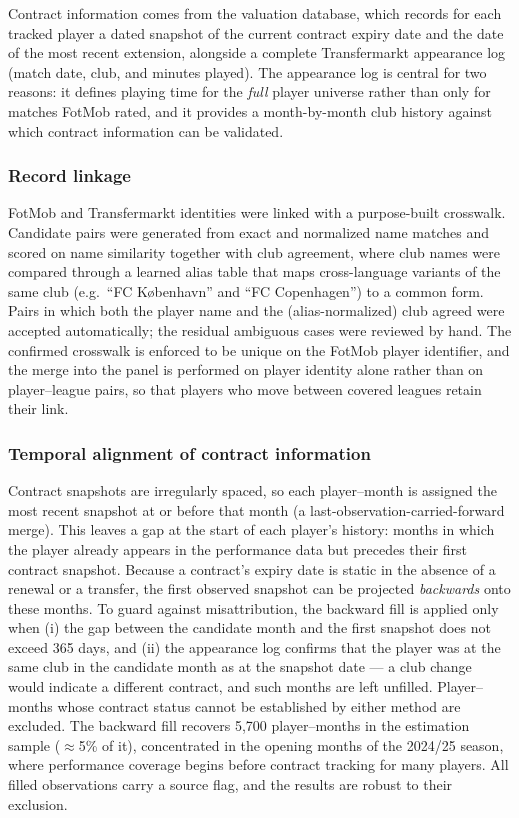 Contract information comes from the valuation database, which records
for each tracked player a dated snapshot of the current contract
expiry date and the date of the most recent extension, alongside a
complete Transfermarkt appearance log (match date, club, and minutes
played). The appearance log is central for two reasons: it defines
playing time for the \emph{full} player universe rather than only for
matches FotMob rated, and it provides a month-by-month club history
against which contract information can be validated.

\subsubsection*{Record linkage}

FotMob and Transfermarkt identities were linked with a purpose-built
crosswalk. Candidate pairs were generated from exact and normalized
name matches and scored on name similarity together with club
agreement, where club names were compared through a learned alias
table that maps cross-language variants of the same club (e.g.\ ``FC
K\o benhavn'' and ``FC Copenhagen'') to a common form. Pairs in which
both the player name and the (alias-normalized) club agreed were
accepted automatically; the residual ambiguous cases were reviewed by
hand. The confirmed crosswalk is enforced to be unique on the FotMob
player identifier, and the merge into the panel is performed on
player identity alone rather than on player--league pairs, so that
players who move between covered leagues retain their link.

\subsubsection*{Temporal alignment of contract information}

Contract snapshots are irregularly spaced, so each player--month is
assigned the most recent snapshot at or before that month (a
last-observation-carried-forward merge). This leaves a gap at the
start of each player's history: months in which the player already
appears in the performance data but precedes their first contract
snapshot. Because a contract's expiry date is static in the absence
of a renewal or a transfer, the first observed snapshot can be
projected \emph{backwards} onto these months. To guard against
misattribution, the backward fill is applied only when (i) the gap
between the candidate month and the first snapshot does not exceed
365 days, and (ii) the appearance log confirms that the player was at
the same club in the candidate month as at the snapshot date --- a
club change would indicate a different contract, and such months are
left unfilled. Player--months whose contract status cannot be
established by either method are excluded. The backward fill
recovers 5{,}700 player--months in the estimation sample
($\approx$5\% of it), concentrated in the opening months of the
2024/25 season, where performance coverage begins before contract
tracking for many players. All filled observations carry a source
flag, and the results are robust to their exclusion.

